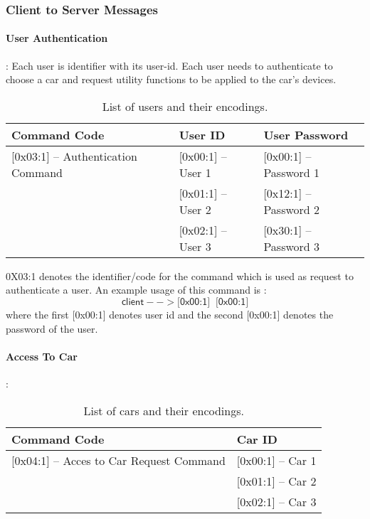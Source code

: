 \subsubsection{Client to Server Messages}
\label{sec:pdus:pdu:c_to_s}

\paragraph{User Authentication}: Each user is identifier with its user-id. Each user needs to authenticate to choose a car and request utility functions to be applied to the car's devices.
\begin{table}[ht!]
  \centering

\begin{tabular}{l l l}
\hline
\textbf{Command Code} & \textbf{User ID} &   \textbf{User Password}  \\
\hline

\hline
\textsf{[0x03:1]} -- Authentication Command  & \textsf{[0x00:1]} -- User 1 & \textsf{[0x00:1]} -- Password 1   \\
\hline
                  & \textsf{[0x01:1]} -- User 2 & \textsf{[0x12:1]} -- Password 2 \\
\hline
                 & \textsf{[0x02:1]}  -- User 3 & \textsf{[0x30:1]} -- Password 3\\
\hline
\hline
\end{tabular}
\caption{List of users and their encodings.}
\end{table}

\textsf{0X03:1} denotes the identifier/code for the command which is used as request to authenticate a user. An example usage of this command is :
\[\textsf{client} --> \textsf{[0x00:1]} \;\; \textsf{[0x00:1]}\]
where the first \textsf{[0x00:1]} denotes user id and the second \textsf{[0x00:1]} denotes the password of the user.

\paragraph{Access To Car}:

\begin{table}[ht!]
  \centering

\begin{tabular}{l l}
\hline
\textbf{Command Code} & \textbf{Car ID}   \\
\hline

\hline
\textsf{[0x04:1]} -- Acces to Car Request Command & \textsf{[0x00:1]} -- Car 1  \\
\hline
                  & \textsf{[0x01:1]} -- Car 2 \\
\hline
                 & \textsf{[0x02:1]}  -- Car 3\\
\hline
\hline
\end{tabular}
\caption{List of cars and their encodings.}
\end{table}


